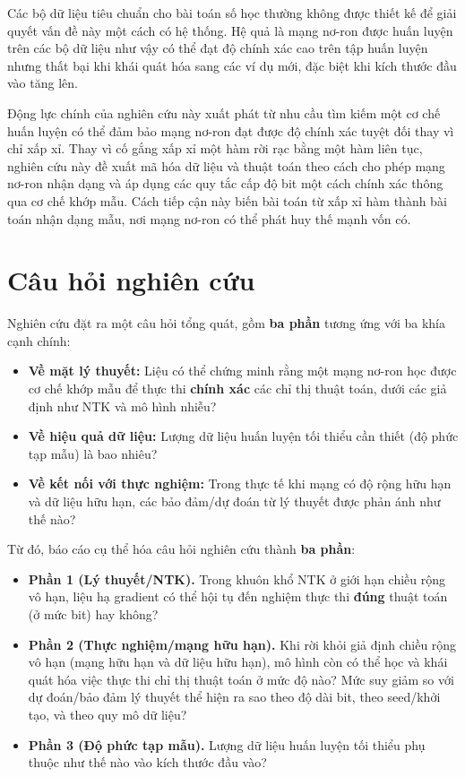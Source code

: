 Các bộ dữ liệu tiêu chuẩn cho bài toán số học thường không được thiết kế để giải quyết vấn đề này một cách có hệ thống. Hệ quả là mạng nơ-ron được huấn luyện trên các bộ dữ liệu như vậy có thể đạt độ chính xác cao trên tập huấn luyện nhưng thất bại khi khái quát hóa sang các ví dụ mới, đặc biệt khi kích thước đầu vào tăng lên.

Động lực chính của nghiên cứu này xuất phát từ nhu cầu tìm kiếm một cơ chế huấn luyện có thể đảm bảo mạng nơ-ron đạt được độ chính xác tuyệt đối thay vì chỉ xấp xỉ. Thay vì cố gắng xấp xỉ một hàm rời rạc bằng một hàm liên tục, nghiên cứu này đề xuất mã hóa dữ liệu và thuật toán theo cách cho phép mạng nơ-ron nhận dạng và áp dụng các quy tắc cấp độ bit một cách chính xác thông qua cơ chế khớp mẫu. Cách tiếp cận này biến bài toán từ xấp xỉ hàm thành bài toán nhận dạng mẫu, nơi mạng nơ-ron có thể phát huy thế mạnh vốn có.

\section{Câu hỏi nghiên cứu}

Nghiên cứu đặt ra một câu hỏi tổng quát, gồm \textbf{ba phần} tương ứng với ba khía cạnh chính:
\begin{itemize}
    \item \textbf{Về mặt lý thuyết:} Liệu có thể chứng minh rằng một mạng nơ-ron học được cơ chế khớp mẫu để thực thi \textbf{chính xác} các chỉ thị thuật toán, dưới các giả định như NTK và mô hình nhiễu?
    \item \textbf{Về hiệu quả dữ liệu:} Lượng dữ liệu huấn luyện tối thiểu cần thiết (độ phức tạp mẫu) là bao nhiêu?
    \item \textbf{Về kết nối với thực nghiệm:} Trong thực tế khi mạng có độ rộng hữu hạn và dữ liệu hữu hạn, các bảo đảm/dự đoán từ lý thuyết được phản ánh như thế nào?
\end{itemize}


Từ đó, báo cáo cụ thể hóa câu hỏi nghiên cứu thành \textbf{ba phần}:

\begin{itemize}
    \item \textbf{Phần 1 (Lý thuyết/NTK).} Trong khuôn khổ NTK ở giới hạn chiều rộng vô hạn, liệu hạ gradient có thể hội tụ đến nghiệm thực thi \textbf{đúng} thuật toán (ở mức bit) hay không?
    \item \textbf{Phần 2 (Thực nghiệm/mạng hữu hạn).} Khi rời khỏi giả định chiều rộng vô hạn (mạng hữu hạn và dữ liệu hữu hạn), mô hình còn có thể học và khái quát hóa việc thực thi chỉ thị thuật toán ở mức độ nào? Mức suy giảm so với dự đoán/bảo đảm lý thuyết thể hiện ra sao theo độ dài bit, theo seed/khởi tạo, và theo quy mô dữ liệu?
    \item \textbf{Phần 3 (Độ phức tạp mẫu).} Lượng dữ liệu huấn luyện tối thiểu phụ thuộc như thế nào vào kích thước đầu vào?
\end{itemize}


